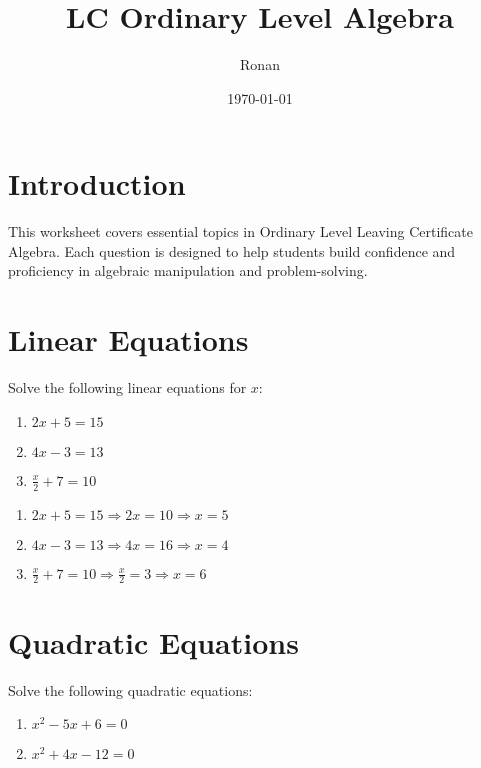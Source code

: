 \documentclass[a4paper,12pt]{article}
\title{LC Ordinary Level Algebra}
\author{Ronan}
\date{\today}
\begin{document}
\maketitle

\section*{Introduction}
This worksheet covers essential topics in Ordinary Level Leaving Certificate Algebra. Each question is designed to help students build confidence and proficiency in algebraic manipulation and problem-solving.

\section{Linear Equations}
\begin{question}
Solve the following linear equations for \( x \):
\begin{enumerate}
    \item \( 2x + 5 = 15 \)
    \item \( 4x - 3 = 13 \)
    \item \( \frac{x}{2} + 7 = 10 \)
\end{enumerate}
\end{question}

\begin{solution}
\begin{enumerate}
    \item \( 2x + 5 = 15 \Rightarrow 2x = 10 \Rightarrow x = 5 \)
    \item \( 4x - 3 = 13 \Rightarrow 4x = 16 \Rightarrow x = 4 \)
    \item \( \frac{x}{2} + 7 = 10 \Rightarrow \frac{x}{2} = 3 \Rightarrow x = 6 \)
\end{enumerate}
\end{solution}

\section{Quadratic Equations}
\begin{question}
Solve the following quadratic equations:
\begin{enumerate}
    \item \( x^2 - 5x + 6 = 0 \)
    \item \( x^2 + 4x - 12 = 0 \)
\end{enumerate}
\end{question}
\end{document}

